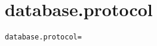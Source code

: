 \section{database.protocol}
\label{configuration:DatabaseProtocol}
\ClearAPI
\TODO
{}
\begin{lstlisting}[style=Props,caption={Usage example for \textit{database.protocol}}]
database.protocol=
\end{lstlisting}